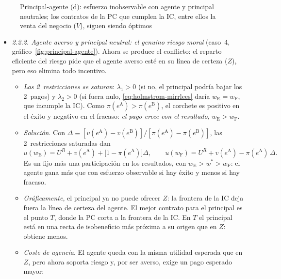 \documentclass[11pt]{article}
\begin{document}
\begin{figure}[H]
\centering
\caption{Principal-agente (d): esfuerzo inobservable con agente y principal neutrales; los contratos de la PC que cumplen la IC, entre ellos la venta del negocio ($V$), siguen siendo óptimos}\label{fig:pa-neutrales}
\end{figure}

\begin{itemize}
\item \emph{2.2.2. Agente averso y principal neutral: el genuino riesgo moral} (caso~4, gráfico~\ref{fig:principal-agente}). Ahora se produce el conflicto: el reparto eficiente del riesgo pide que el agente averso esté en su línea de certeza ($Z$), pero eso elimina todo incentivo.
  \begin{itemize}
  \item \emph{Las 2~restricciones se saturan}: $\lambda_1>0$ (si no, el principal podría bajar los 2~pagos) y $\lambda_2>0$ (si fuera nulo, \eqref{eq:holmstrom-mirrlees} daría $w_{\mathrm{E}}=w_{\mathrm{F}}$, que incumple la IC). Como $\pi(e^{\mathrm{A}})>\pi(e^{\mathrm{B}})$, el corchete es positivo en el éxito y negativo en el fracaso: \emph{el pago crece con el resultado}, $w_{\mathrm{E}}>w_{\mathrm{F}}$.
  \item \emph{Solución}. Con $\Delta\equiv[v(e^{\mathrm{A}})-v(e^{\mathrm{B}})]/[\pi(e^{\mathrm{A}})-\pi(e^{\mathrm{B}})]$, las 2~restricciones saturadas dan
  \begin{equation}
  u(w_{\mathrm{E}})=U^R+v(e^{\mathrm{A}})+\bigl[1-\pi(e^{\mathrm{A}})\bigr]\Delta,\qquad u(w_{\mathrm{F}})=U^R+v(e^{\mathrm{A}})-\pi(e^{\mathrm{A}})\,\Delta . \label{eq:pagos-segundo-optimo}
  \end{equation}
  Es un fijo más una participación en los resultados, con $w_{\mathrm{E}}>w^*>w_{\mathrm{F}}$: el agente gana más que con esfuerzo observable si hay éxito y menos si hay fracaso.
  \item \emph{Gráficamente}, el principal ya no puede ofrecer $Z$: la frontera de la IC deja fuera la línea de certeza del agente. El mejor contrato para el principal es el punto $T$, donde la PC corta a la frontera de la IC. En $T$ el principal está en una recta de isobeneficio más próxima a su origen que en $Z$: obtiene menos.
  \item \emph{Coste de agencia}. El agente queda con la misma utilidad esperada que en $Z$, pero ahora soporta riesgo y, por ser averso, exige un pago esperado mayor:

\end{itemize}
\end{itemize}
\end{document}
